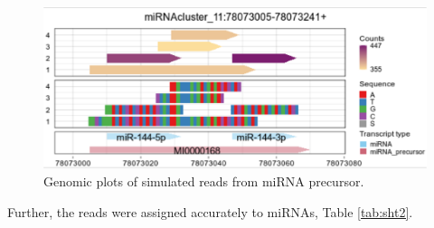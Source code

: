 \documentclass[12pt,twoside]{reedthesis}
\begin{document}
\begin{figure}[htbp]

{\centering \includegraphics{thesis_files/figure-latex/3f15-1} 

}

\caption{Genomic plots of simulated reads from miRNA precursor.}\label{fig:3f15}
\end{figure}
Further, the reads were assigned accurately to miRNAs, Table \ref{tab:sht2}.
\end{document}

